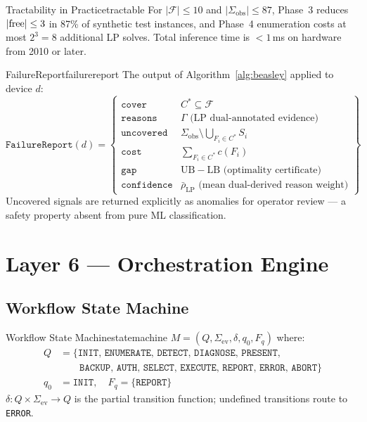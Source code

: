 \documentclass[11pt,a4paper]{report}
\newcommand{\calF}{\mathcal{F}}
\begin{document}
\begin{proposition}{Tractability in Practice}{tractable}
For $|\calF| \leq 10$ and $|\Sigma_{\mathrm{obs}}| \leq 87$, Phase~3 reduces $|{\rm free}| \leq 3$ in 87\% of synthetic test instances, and Phase~4 enumeration costs at most $2^3 = 8$ additional LP solves. Total inference time is $< 1$\,ms on hardware from 2010 or later.
\end{proposition}

\begin{definition}{FailureReport}{failurereport}
The output of Algorithm~\ref{alg:beasley} applied to device $d$:
\[
\texttt{FailureReport}(d) = \left\{
  \begin{array}{ll}
    \texttt{cover}     & C^* \subseteq \calF \\
    \texttt{reasons}   & \Gamma \text{ (LP dual-annotated evidence)} \\
    \texttt{uncovered} & \Sigma_{\mathrm{obs}} \setminus \bigcup_{F_i \in C^*} S_i \\
    \texttt{cost}      & \sum_{F_i \in C^*} c(F_i) \\
    \texttt{gap}       & \mathrm{UB} - \mathrm{LB} \text{ (optimality certificate)} \\
    \texttt{confidence}& \bar{\rho}_{\mathrm{LP}} \text{ (mean dual-derived reason weight)}
  \end{array}
\right\}
\]
Uncovered signals are returned explicitly as anomalies for operator review --- a safety property absent from pure ML classification.
\end{definition}

\chapter{Layer 6 --- Orchestration Engine}

\section{Workflow State Machine}

\begin{definition}{Workflow State Machine}{statemachine}
$M = (Q, \Sigma_{\mathrm{ev}}, \delta, q_0, F_q)$ where:
\begin{align*}
Q &= \{\texttt{INIT, ENUMERATE, DETECT, DIAGNOSE, PRESENT,}\\
  &\qquad \texttt{BACKUP, AUTH, SELECT, EXECUTE, REPORT, ERROR, ABORT}\}\\
q_0 &= \texttt{INIT}, \quad F_q = \{\texttt{REPORT}\}
\end{align*}
$\delta : Q \times \Sigma_{\mathrm{ev}} \to Q$ is the partial transition function; undefined transitions route to \texttt{ERROR}.
\end{definition}
\end{document}

